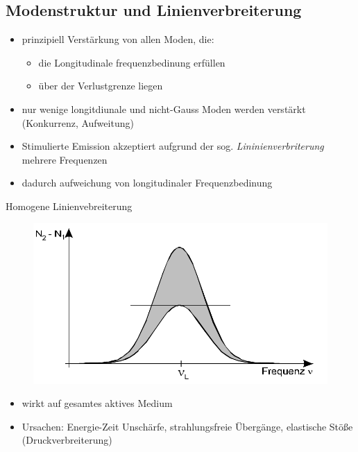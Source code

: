 \documentclass[10pt, aspectratio=169]{beamer}
\begin{document}
\subsection{Modenstruktur und Linienverbreiterung}
\begin{frame}
  \begin{itemize}
  \item<1-> prinzipiell Verst\"arkung von allen Moden, die:
    \begin{itemize}
    \item die Longitudinale frequenzbedinung erf\"ullen
    \item \"uber der Verlustgrenze liegen 
    \end{itemize}
  \item<2-> nur wenige longitdiunale und nicht-Gauss Moden werden
    verst\"arkt (Konkurrenz, Aufweitung)~\cite[171]{Sigrist2018}
  \item<3-> Stimulierte Emission akzeptiert aufgrund der
    sog. \emph{Lininienverbriterung} mehrere Frequenzen
  \item<4-> dadurch aufweichung von longitudinaler Frequenzbedinung
  \end{itemize}
\end{frame}

\begin{frame}{Homogene Linienvebreiterung}
  \begin{figure}
    \includegraphics[width=.4\columnwidth]{homogen.png}
  \end{figure}

  \begin{itemize}
  \item<1-> wirkt auf gesamtes aktives Medium
  \item<2-> Ursachen: Energie-Zeit Unsch\"arfe, strahlungsfreie
    \"Uberg\"ange, elastische St\"o\ss{}e
    (Druckverbreiterung)
  \end{itemize}
\end{frame}
\end{document}
